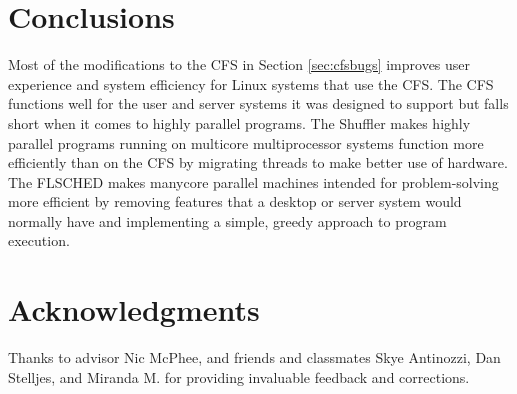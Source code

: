 \documentclass{sig-alternate}
\begin{document}
\section{Conclusions}
\label{sec:conclusions}

Most of the modifications to the CFS in Section \ref{sec:cfsbugs} improves user experience and system efficiency for Linux systems that use the CFS. The CFS functions well for the user and server systems it was designed to support but falls short when it comes to highly parallel programs. The Shuffler makes highly parallel programs running on multicore multiprocessor systems function more efficiently than on the CFS by migrating threads to make better use of hardware. The FLSCHED makes manycore parallel machines intended for problem-solving more efficient by removing features that a desktop or server system would normally have and implementing a simple, greedy approach to program execution.

\section*{Acknowledgments}
\label{sec:acknowledgments}
Thanks to advisor Nic McPhee, and friends and classmates Skye Antinozzi, Dan Stelljes, and Miranda M. for providing invaluable feedback and corrections.


  
\end{document}
